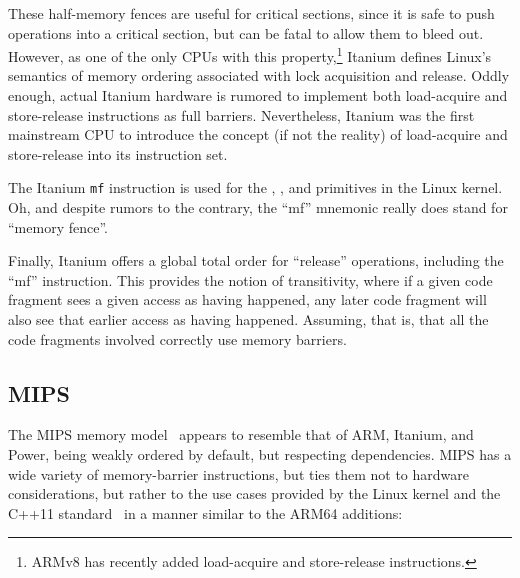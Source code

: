 These half-memory fences are useful for critical sections, since
it is safe to push operations into a critical section, but can be
fatal to allow them to bleed out.
However, as one of the only CPUs with this property,\footnote{
	ARMv8 has recently added load-acquire and store-release instructions.}
Itanium defines
Linux's semantics of memory ordering associated with lock acquisition
and release.
Oddly enough, actual Itanium hardware is rumored to implement
both load-acquire and store-release instructions as full barriers.
Nevertheless, Itanium was the first mainstream CPU to introduce the concept
(if not the reality) of load-acquire and store-release into its
instruction set.

The Itanium {\tt mf} instruction is used for the ,
, and  primitives in the Linux kernel.
Oh, and despite rumors to the contrary, the ``mf'' mnemonic really
does stand for ``memory fence''.

Finally, Itanium offers a global total order for ``release'' operations,
including the ``mf'' instruction.
This provides the notion of transitivity, where if a given code fragment
sees a given access as having happened, any later code fragment will
also see that earlier access as having happened.
Assuming, that is, that all the code fragments involved correctly use
memory barriers.

\subsection{MIPS}

The MIPS memory model~\cite[Table 6.6]{MIPSvII-A-2015}
appears to resemble that of ARM, Itanium, and Power,
being weakly ordered by default, but respecting dependencies.
MIPS has a wide variety of memory-barrier instructions, but ties them
not to hardware considerations, but rather to the use cases provided
by the Linux kernel and the C++11 standard~\cite{RichardSmith2015N4527}
in a manner similar to the ARM64 additions:

